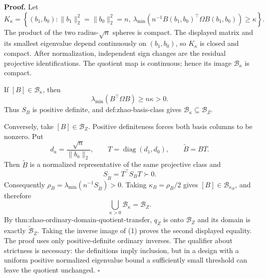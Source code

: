\textbf{Proof.}
Let
\[
K_\kappa=\left\{(b_1,b_0):\lVert b_1\rVert_2^2=\lVert b_0\rVert_2^2=n,
\ \lambda_{\min}\!\left(n^{-1}B(b_1,b_0)^{\top}\Omega B(b_1,b_0)\right)\ge\kappa\right\}.
\]
The product of the two radius-\(\sqrt n\) spheres is compact.  The displayed matrix and its smallest eigenvalue depend continuously on \((b_1,b_0)\), so \(K_\kappa\) is closed and compact.  After normalization, independent sign changes are the residual projective identifications.  The quotient map is continuous; hence its image \(\mathcal B_\kappa\) is compact.

If \([B]\in\mathcal B_\kappa\), then
\[
\lambda_{\min}(B^{\top}\Omega B)\ge n\kappa>0.
\]
Thus \(S_B\) is positive definite, and def:zhao-basis-class gives \(\mathcal B_\kappa\subseteq\mathcal B_Z\).

Conversely, take \([B]\in\mathcal B_Z\).  Positive definiteness forces both basis columns to be nonzero.  Put
\[
d_a=\frac{\sqrt n}{\lVert b_a\rVert_2},\qquad
T=\operatorname{diag}(d_1,d_0),\qquad
\widetilde B=BT.
\]
Then \(\widetilde B\) is a normalized representative of the same projective class and
\[
S_{\widetilde B}=T^{\top}S_BT\succ0.
\]
Consequently \(\rho_B=\lambda_{\min}(n^{-1}S_{\widetilde B})>0\).  Taking \(\kappa_B=\rho_B/2\) gives \([B]\in\mathcal B_{\kappa_B}\), and therefore
\[
\bigcup_{\kappa>0}\mathcal B_\kappa=\mathcal B_Z. \tag{1}
\]
By thm:zhao-ordinary-domain-quotient-transfer, \(q_Z\) is onto \(\mathcal B_Z\) and its domain is exactly \(\widetilde{\mathcal B}_Z\).  Taking the inverse image of (1) proves the second displayed equality.  The proof uses only positive-definite ordinary inverses.  The qualifier about strictness is necessary: the definitions imply inclusion, but in a design with a uniform positive normalized eigenvalue bound a sufficiently small threshold can leave the quotient unchanged. \(\square\)